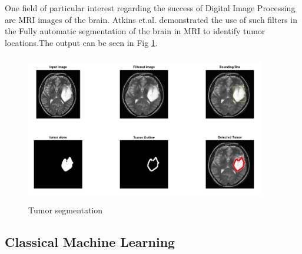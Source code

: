 \documentclass[19pt]{article}
\begin{document}
One field of particular interest regarding the success of Digital Image Processing are MRI images of the brain. Atkins et.al. \cite{atkins1998fully} demonstrated the use of such filters in the Fully automatic segmentation of the brain in MRI to identify tumor locations.The output can be seen in Fig \ref{fig:4}. 

\begin{center}
    \begin{figure}[!h!t!b]
        \centerline{\includegraphics[width=105mm,height=65mm]{images/mri.jpeg}}
        \caption{Tumor segmentation}
        \label{fig:4}
    \end{figure}
\end{center}

\subsection{Classical Machine Learning}
\end{document}
